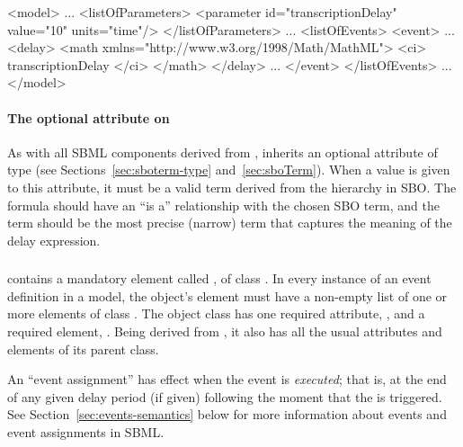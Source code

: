 \begin{example}
<model>
    ...
    <listOfParameters>
        <parameter id="transcriptionDelay" value="10" units="time"/>
    </listOfParameters>
    ...
    <listOfEvents>
        <event>
            ...
            <delay>
                <math xmlns="http://www.w3.org/1998/Math/MathML">
                    <ci> transcriptionDelay </ci>
                </math>
            </delay>
            ...
        </event>
    </listOfEvents>
    ...
</model>
\end{example}


\paragraph{The optional  attribute on }
\label{sec:delay-sboterm}

As with all SBML components derived from \SBase, \Delay inherits
an optional  attribute of type  (see
Sections~\ref{sec:sboterm-type} and~\ref{sec:sboTerm}).  When a
value is given to this attribute, it must be a valid term derived from
the \sbomathformula hierarchy in SBO.  The \Delay formula should
have an ``is a'' relationship with the chosen SBO term, and the
term should be the most precise (narrow) term that captures the
meaning of the delay expression.



\subsubsection{}
\label{sec:eventassignment}
\label{sec:listofeventassignments}

\Event contains a mandatory element called
, of class \ListOfEventAssignments.
In every instance of an event definition in a model, the object's
 element must have a non-empty list
of one or more  elements of class
\EventAssignment.  The object class \EventAssignment has one
required attribute, , and a required element,
.  Being derived from \SBase, it also has all the
usual attributes and elements of its parent class.

An ``event assignment'' has effect when the event is
\emph{executed}; that is, at the end of any given delay period (if
given) following the moment that the \Event is triggered.  See
Section~\ref{sec:events-semantics} below for more information
about events and event assignments in SBML.


